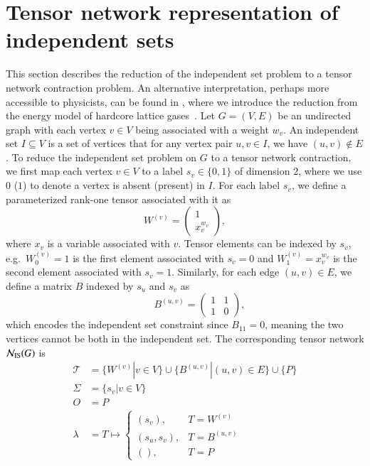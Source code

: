 \documentclass[review, onefignum, onetabnum]{siamart190516}
\begin{document}
\section{Tensor network representation of independent sets} \label{sec:tnmap}
This section describes the reduction of the independent set problem to a tensor network contraction problem.
An alternative interpretation, perhaps more accessible to physicists, can be found in , where we introduce the reduction from the energy model of hardcore lattice gases~\cite{Dyre2016, Fernandes2007}.
Let $G=(V,E)$ be an undirected graph with each vertex $v\in V$ being associated with a weight $w_v$.
An independent set $I \subseteq V$ is a set of vertices that for any vertex pair $u,v \in I$, we have $(u, v) \not\in E$.
To reduce the independent set problem on $G$ to a tensor network contraction, we first map each vertex $v\in V$ to a label $s_v \in \{0, 1\}$ of dimension $2$, where we use $0$ ($1$) to denote a vertex is absent (present) in $I$.
For each label $s_v$, we define a parameterized rank-one tensor associated with it as
\begin{equation}
    W^{(v)} = \left(\begin{matrix}
        1 \\
        x_v^{w_v}
    \end{matrix}\right),\label{eq:vertextensor}
\end{equation}
where $x_v$ is a variable associated with $v$.
Tensor elements can be indexed by $s_v$, e.g.\ $W^{(v)}_0=1$ is the first element associated with $s_v=0$ and $W^{(v)}_1=x_v^{w_v}$ is the second element associated with $s_v=1$.
Similarly, for each edge $(u, v) \in E$, we define a matrix $B$ indexed by $s_u$ and $s_v$ as
\begin{equation}
    \qquad \quad 
       B^{(u, v)} = \left(\begin{matrix}
        1  & 1\\
        1 & 0
    \end{matrix}\right), \label{eq:edgetensor}
\end{equation}
which encodes the independent set constraint since $B_{11} = 0$, meaning the two vertices cannot be both in the independent set. 
The corresponding tensor network $\mathcal{N}_{\rm IS}(G)$ is
\begin{equation}\label{eq:mistensornetwork}
\begin{split}
    \mathcal{T} &= \{W^{(v)} | v\in V\} \cup \{B^{(u, v)} | (u, v) \in E\} \cup \{P\}\\
    \Sigma &= \{s_v | v \in V\}\\
    O &= P\\
    \lambda &= T \mapsto \begin{cases}
                    (s_v), &T = W^{(v)}\\
                    (s_u, s_v), &T = B^{(u, v)}\\
                    (), & T = P
                    \end{cases}
    \end{split}
\end{equation}
\end{document}
